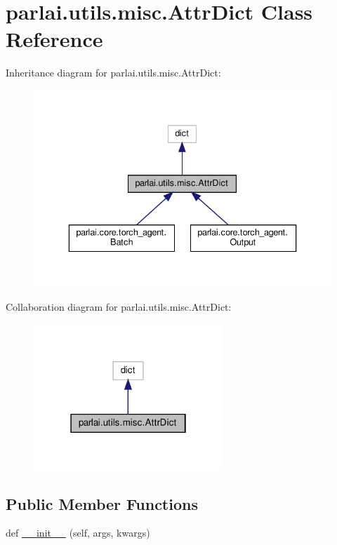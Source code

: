 \hypertarget{classparlai_1_1utils_1_1misc_1_1AttrDict}{}\section{parlai.\+utils.\+misc.\+Attr\+Dict Class Reference}
\label{classparlai_1_1utils_1_1misc_1_1AttrDict}


Inheritance diagram for parlai.\+utils.\+misc.\+Attr\+Dict\+:
\nopagebreak
\begin{figure}[H]
\begin{center}
\leavevmode
\includegraphics[width=336pt]{df/db8/classparlai_1_1utils_1_1misc_1_1AttrDict__inherit__graph}
\end{center}
\end{figure}


Collaboration diagram for parlai.\+utils.\+misc.\+Attr\+Dict\+:
\nopagebreak
\begin{figure}[H]
\begin{center}
\leavevmode
\includegraphics[width=202pt]{dc/d90/classparlai_1_1utils_1_1misc_1_1AttrDict__coll__graph}
\end{center}
\end{figure}
\subsection*{Public Member Functions}
\begin{DoxyCompactItemize}
\item 
def \hyperlink{classparlai_1_1utils_1_1misc_1_1AttrDict_a8a0ed33202adee184fc7ec06cf89a7ba}{\+\_\+\+\_\+init\+\_\+\+\_\+} (self, args, kwargs)
\end{DoxyCompactItemize}


